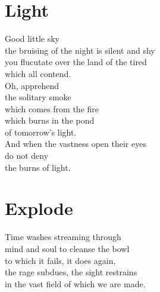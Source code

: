 \documentclass[a4paper,twoside, openany]{book}
\newenvironment{Verse}
  {\center\varwidth{\linewidth}\fontsize{18}{21.6}\selectfont}
  {\endvarwidth\endcenter}
\begin{document}
\chapter{Light}
\begin{Verse}
    Good little sky\\
    the bruising of the night is silent and shy\\
    you flucutate over the land of the tired\\
    which all contend.\\
    Oh, apprehend\\
    the solitary smoke\\
    which comes from the fire\\
    which burns in the pond\\
    of tomorrow's light.\\
    And when the vastness open their eyes\\
    do not deny\\
    the burns of light.
\end{Verse}

\chapter{Explode}
\begin{Verse}
    Time washes streaming through\\
    mind and soul to cleanse the bowl\\
    to which it fails, it does again,\\
    the rage subdues, the sight restrains\\
    in the vast field of which we are made.
\end{Verse}
\end{document}

